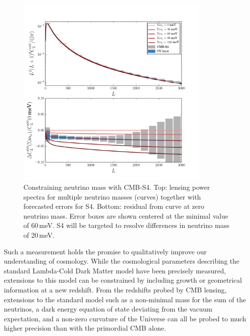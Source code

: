 \begin{figure}[htbp]
\centering
\includegraphics[width=0.85\textwidth]{CMBLensing/s4errors.pdf}
\caption{Constraining neutrino mass with CMB-S4.  Top: lensing power spectra for multiple neutrino masses (curves) together with forecasted errors for S4.  Bottom: residual from curve at zero neutrino mass.  Error boxes are shown centered at the minimal value of $60$\,meV.  S4 will be targeted to resolve differences in neutrino mass of 20\,meV. }
\label{Neutrinos}
\end{figure}

 
Such a measurement holds the promise to qualitatively improve our understanding of cosmology.  While the cosmological parameters describing the standard 
Lambda-Cold Dark Matter model have been precisely measured, extensions to this model can be constrained by including growth or geometrical information at a new redshift.  From the redshifts probed by CMB lensing, extensions to the standard model such as a non-minimal mass for the sum of the neutrinos, a dark energy equation of state deviating from the vacuum expectation, and a non-zero curvature of the Universe can all be probed to much higher precision than with the primordial CMB alone. 





